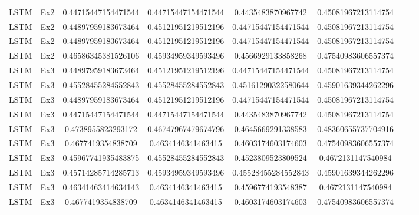 \begin{appendices}
\begin{table}[H]
\begin{longtable}{ccccccll}
LSTM & Ex2 & 0.44715447154471544 & 0.44715447154471544 & 0.4435483870967742 & 0.45081967213114754 \\
LSTM & Ex2 & 0.44897959183673464 & 0.45121951219512196 & 0.44715447154471544 & 0.45081967213114754 \\
LSTM & Ex2 & 0.44897959183673464 & 0.45121951219512196 & 0.44715447154471544 & 0.45081967213114754 \\
LSTM & Ex2 & 0.46586345381526106 & 0.45934959349593496 & 0.4566929133858268 & 0.47540983606557374 \\
LSTM & Ex3 & 0.44897959183673464 & 0.45121951219512196 & 0.44715447154471544 & 0.45081967213114754 \\
LSTM & Ex3 & 0.45528455284552843 & 0.45528455284552843 & 0.45161290322580644 & 0.45901639344262296 \\
LSTM & Ex3 & 0.44897959183673464 & 0.45121951219512196 & 0.44715447154471544 & 0.45081967213114754 \\
LSTM & Ex3 & 0.44715447154471544 & 0.44715447154471544 & 0.4435483870967742 & 0.45081967213114754 \\
LSTM & Ex3 & 0.4738955823293172 & 0.46747967479674796 & 0.4645669291338583 & 0.48360655737704916 \\
LSTM & Ex3 & 0.4677419354838709 & 0.4634146341463415 & 0.4603174603174603 & 0.47540983606557374 \\
LSTM & Ex3 & 0.45967741935483875 & 0.45528455284552843 & 0.4523809523809524 & 0.4672131147540984 \\
LSTM & Ex3 & 0.45714285714285713 & 0.45934959349593496 & 0.45528455284552843 & 0.45901639344262296 \\
LSTM & Ex3 & 0.46341463414634143 & 0.4634146341463415 & 0.4596774193548387 & 0.4672131147540984 \\
LSTM & Ex3 & 0.4677419354838709 & 0.4634146341463415 & 0.4603174603174603 & 0.47540983606557374 \\ \hline
\end{longtable}
\end{table}


\thispagestyle{empty}



\end{appendices}
